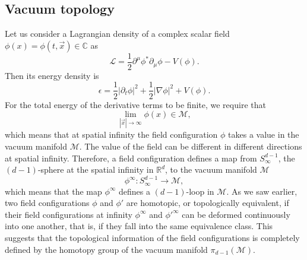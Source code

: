 \subsection{Vacuum topology}\label{sec:vactop}

 Let us consider a Lagrangian density of a complex scalar field $\phi(x) = \phi(t,\vec{x})\in \mathbb{C}$ as
\begin{equation}
	\mathcal{L} = \frac{1}{2}\partial^{\mu} \phi^* \partial_{\mu} \phi  - V(\phi).
\end{equation}
Then its energy density is
\begin{equation}
		\epsilon = \frac{1}{2}|\partial_t \phi|^2 + \frac{1}{2}|\nabla \phi|^2 + V(\phi).
\end{equation}
For the total energy of the derivative terms to be finite, we require that
\begin{equation}
	\lim_{|\vec{x}|\to\infty} \phi(x) \in \mathcal{M},
\end{equation}
which means that at spatial infinity the field configuration $\phi$ takes a value in the vacuum manifold $\mathcal{M}$. The value of the field can be different in different directions at spatial infinity. Therefore, a field configuration defines a map from $S^{d-1}_{\infty}$, the $(d-1)$-sphere at the spatial infinity in $\mathbb{R}^d$, to the vacuum manifold $\mathcal{M}$
\begin{equation}
	\phi^{\infty} : S^{d-1}_{\infty}\to\mathcal{M},
\end{equation}
which means that the map $\phi^{\infty}$ defines a $(d-1)$-loop in $\mathcal{M}$.
As we saw earlier, two field configurations $\phi$ and $\phi'$ are homotopic, or topologically equivalent, if their field configurations at infinity $\phi^{\infty}$ and $\phi'^{\infty}$ can be deformed continuously into one another, that is, if they fall into the same equivalence class. This suggests that the topological information of the field configurations is com\-plete\-ly defined by the homotopy group of the vacuum manifold $\pi_{d-1}(\mathcal{M})$.


